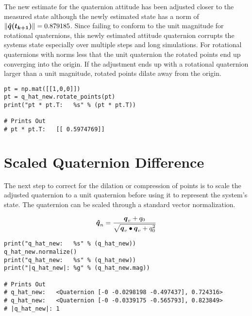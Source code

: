 The new estimate for the quaternion attitude has been adjusted closer to the measured state although the newly estimated state has a norm of $ \| \boldsymbol{\hat{q}(t_{k+1})} \| = 0.879185$.  Since failing to conform to the unit magnitude for rotational quaternions, this newly estimated attitude quaternion corrupts the systems state especially over multiple steps and long simulations.  For rotational quaternions with norms less that the unit quaternion the rotated points end up converging into the origin.  If the adjustment ends up with a rotational quaternion larger than a unit magnitude, rotated points dilate away from the origin.

\begin{singlespace}
  \begin{verbatim}
pt = np.mat([[1,0,0]])
pt = q_hat_new.rotate_points(pt)
print("pt * pt.T:   %s" % (pt * pt.T))

# Prints Out
# pt * pt.T:   [[ 0.5974769]]
  \end{verbatim}
\nocite{minted}
\end{singlespace}


\section{Scaled Quaternion Difference}
\label{sec:ScaledQuaternionDifference}

The next step to correct for the dilation or compression of points is to scale the adjusted quaternion to a unit quaternion before using it to represent the system's state.  The quaternion can be scaled through a standard vector normalization.

\begin{equation}
  \boldsymbol{\hat{q}}_n = \frac{\boldsymbol{q}_v + q_0}{\sqrt{\boldsymbol{q}_v \bullet \boldsymbol{q}_v + q_0^2}}
  \label{eqn:NormalizeQuaternion}
\end{equation}

\begin{singlespace}
  \begin{verbatim}
print("q_hat_new:   %s" % (q_hat_new))
q_hat_new.normalize()
print("q_hat_new:   %s" % (q_hat_new))
print("|q_hat_new|: %g" % (q_hat_new.mag))

# Prints Out
# q_hat_new:   <Quaternion [-0 -0.0298198 -0.497437], 0.724316>
# q_hat_new:   <Quaternion [-0 -0.0339175 -0.565793], 0.823849>
# |q_hat_new|: 1
  \end{verbatim}
\nocite{minted}
\end{singlespace}

